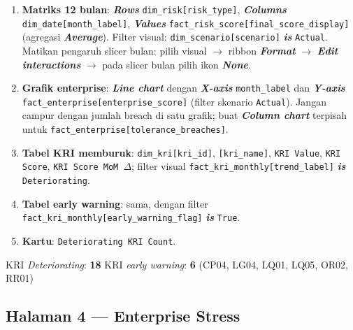 \documentclass[11pt,a4paper]{article}
\newcommand{\file}[1]{\texttt{\small #1}}
\newcommand{\ui}[1]{\textbf{\textit{#1}}}
\begin{document}
\begin{enumerate}
\item \textbf{Matriks 12 bulan}: \ui{Rows} \file{dim\_risk[risk\_type]}, \ui{Columns} \file{dim\_date[month\_label]}, \ui{Values} \file{fact\_risk\_score[final\_score\_display]} (agregasi \ui{Average}). Filter visual: \file{dim\_scenario[scenario]} \ui{is} \texttt{Actual}. Matikan pengaruh slicer bulan: pilih visual $\rightarrow$ ribbon \ui{Format} $\rightarrow$ \ui{Edit interactions} $\rightarrow$ pada slicer bulan pilih ikon \ui{None}.
\item \textbf{Grafik enterprise}: \ui{Line chart} dengan \ui{X-axis} \file{month\_label} dan \ui{Y-axis} \file{fact\_enterprise[enterprise\_score]} (filter skenario \texttt{Actual}). Jangan campur dengan jumlah breach di satu grafik; buat \ui{Column chart} terpisah untuk \file{fact\_enterprise[tolerance\_breaches]}.
\item \textbf{Tabel KRI memburuk}: \file{dim\_kri[kri\_id]}, \file{[kri\_name]}, \file{KRI Value}, \file{KRI Score}, \file{KRI Score MoM $\Delta$}; filter visual \file{fact\_kri\_monthly[trend\_label]} \ui{is} \texttt{Deteriorating}.
\item \textbf{Tabel early warning}: sama, dengan filter \file{fact\_kri\_monthly[early\_warning\_flag]} \ui{is} \texttt{True}.
\item \textbf{Kartu}: \file{Deteriorating KRI Count}.
\end{enumerate}

\begin{tipbox}
KRI \emph{Deteriorating}: \textbf{18} \textbullet{} KRI \emph{early warning}: \textbf{6} (CP04, LG04, LQ01, LQ05, OR02, RR01)
\end{tipbox}

\subsection{Halaman 4 --- Enterprise Stress}
\end{document}

